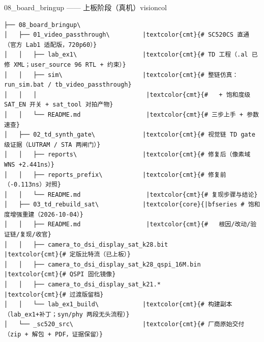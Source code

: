\documentclass[10pt]{ctexart}
\begin{document}
\vspace{2.2mm}
\begin{sectbox}{08\_board\_bringup —— 上板阶段（真机）}{visioncol}
\begin{Verbatim}[fontsize=\scriptsize, commandchars=\|\{\}]
├── 08_board_bringup\
│   ├── 01_video_passthrough\         |textcolor{cmt}{# SC520CS 直通（官方 Lab1 适配版，720p60）}
│   │   ├── lab_ex1\                  |textcolor{cmt}{# TD 工程（.al 已修 XML；user_source 96 RTL + 约束）}
│   │   ├── sim\                      |textcolor{cmt}{# 整链仿真：run_sim.bat / tb_video_passthrough}
│   │   │                              |textcolor{cmt}{#   + 饱和度级 SAT_EN 开关 + sat_tool 对拍产物}
│   │   └── README.md                  |textcolor{cmt}{# 三步上手 + 参数速查}
│   ├── 02_td_synth_gate\             |textcolor{cmt}{# 视觉链 TD gate 级证据（LUTRAM / STA 两闸门）}
│   │   ├── reports\                  |textcolor{cmt}{# 修复后（像素域 WNS +2.441ns）}
│   │   ├── reports_prefix\           |textcolor{cmt}{# 修复前（-0.113ns）对照}
│   │   └── README.md                  |textcolor{cmt}{# 复现步骤与结论}
│   ├── 03_td_rebuild_sat\            |textcolor{core}{|bfseries # 饱和度增强重建（2026-10-04）}
│   │   ├── README.md                  |textcolor{cmt}{#   根因/改动/验证链/复现/收官}
│   │   ├── camera_to_dsi_display_sat_k28.bit           |textcolor{cmt}{# 定版比特流（已上板）}
│   │   ├── camera_to_dsi_display_sat_k28_qspi_16M.bin  |textcolor{cmt}{# QSPI 固化镜像}
│   │   ├── camera_to_dsi_display_sat_k21.*             |textcolor{cmt}{# 过渡版留档}
│   │   └── lab_ex1_build\            |textcolor{cmt}{# 构建副本（lab_ex1+补丁；syn/phy 两段无头流程）}
│   └── _sc520_src\                   |textcolor{cmt}{# 厂商原始交付（zip + 解包 + PDF，证据保留）}
\end{Verbatim}
\end{sectbox}
\vspace{2.2mm}
\clearpage
\end{document}
